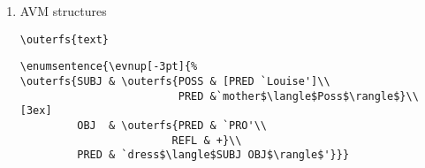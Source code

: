 \begin{enumerate}
{
           {the &police).}
           {It was the IRS that caught him (and not the police).}}
\begin{center}
\begin{verbatim}
\enumsentence{\shortex{6}{Was & ist & dem & Kind & geschenkt&worden?}
                         {What& is  & the & child& given    &been?}
                         {What has been given to the child?}}
               \item \shortexnt{7}
{Das & Fin\'anzamt      & hat & ihn & geschnappt &(und & nicht}
{the &finance authority & has & him & caught     &(and &not}

\shortex{2}{die &Polizei).}
           {the &police)}
           {It was the IRS that caught him (and not the police).}}
\end{verbatim}
\end{center}
Unfortunately, I've not figured out a fullproof method of breaking
the glosses automatically so they have to be done by hand.  

\item AVM structures
\begin{center}
\begin{verbatim}
\outerfs{text}
\end{verbatim}
\end{center}
\begin{center}
\begin{verbatim}
\enumsentence{\evnup[-3pt]{%
\outerfs{SUBJ & \outerfs{POSS & [PRED `Louise']\\
                         PRED &`mother$\langle$Poss$\rangle$}\\[3ex]
         OBJ  & \outerfs{PRED & `PRO'\\
                        REFL & +}\\
         PRED & `dress$\langle$SUBJ OBJ$\rangle$'}}}
\end{verbatim}
\end{center}
\end{enumerate}
